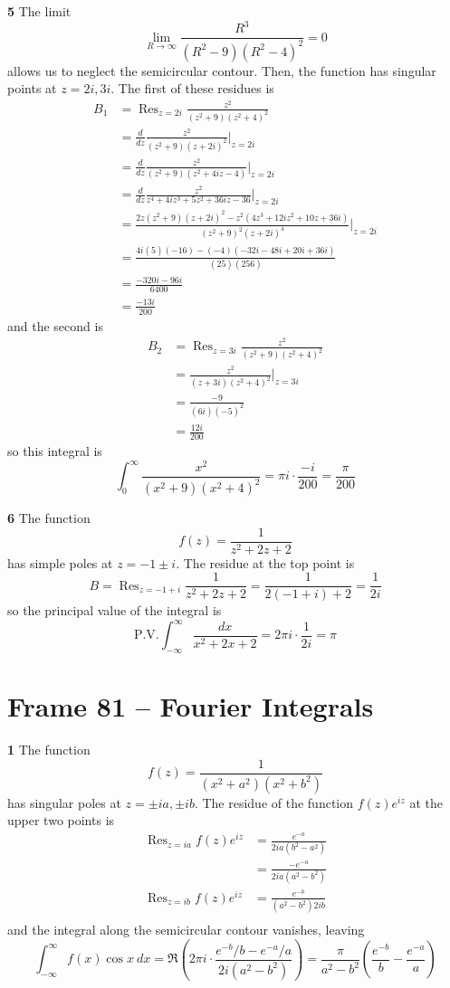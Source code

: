 \documentclass{article}
\DeclareMathOperator{\Res}{Res}
\begin{document}
\textbf{5}
The limit
\[
	\lim_{R \to \infty} \frac{R^3}{(R^2 - 9)(R^2 - 4)^2} = 0
\]
allows us to neglect the semicircular contour. Then, the function has singular points at $z = 2i, 3i$. The first of these residues is
\begin{align*}
	B_1
	&= \Res_{z = 2i} \frac{z^2}{(z^2 + 9)(z^2 + 4)^2} \\
	&= \frac{d}{dz} \frac{z^2}{(z^2 + 9)(z + 2i)^2} \Big|_{z = 2i} \\
	&= \frac{d}{dz} \frac{z^2}{(z^2 + 9)(z^2 + 4iz - 4)}  \Big|_{z = 2i} \\
	&= \frac{d}{dz} \frac{z^2}{z^4 + 4iz^3 + 5z^2 + 36iz - 36} \Big|_{z = 2i} \\
	&= \frac{2z(z^2 + 9)(z + 2i)^2 - z^2(4z^3 + 12iz^2 + 10z + 36i)}
		{(z^2 + 9)^2(z + 2i)^4} \Big|_{z = 2i} \\
	&= \frac{4i(5)(-16) - (-4)(-32i - 48i + 20i + 36i)}{(25)(256)} \\
	&= \frac{-320i - 96i}{6400} \\
	&= \frac{-13i}{200}
\end{align*}
and the second is
\begin{align*}
	B_2
	&= \Res_{z = 3i} \frac{z^2}{(z^2 + 9)(z^2 + 4)^2} \\
	&= \frac{z^2}{(z + 3i)(z^2 + 4)^2} \Big|_{z = 3i} \\
	&= \frac{-9}{(6i)(-5)^2} \\
	&= \frac{12i}{200}
\end{align*}
so this integral is
\[
	\int_0^\infty \frac{x^2}{(x^2 + 9)(x^2 + 4)^2}
	= \pi i \cdot \frac{-i}{200}
	= \frac{\pi}{200}
\]

\textbf{6}
The function
\[
	f(z) = \frac{1}{z^2 + 2z + 2}
\]
has simple poles at $z = -1 \pm i$. The residue at the top point is
\[
	B
	= \Res_{z = -1+i} \frac{1}{z^2 + 2z + 2}
	= \frac{1}{2(-1 + i) + 2} 
	= \frac{1}{2i}
\]
so the principal value of the integral is
\[
	\text{P.V.} \int_{-\infty}^\infty \frac{dx}{x^2 + 2x + 2}
	= 2\pi i \cdot \frac{1}{2i}
	= \pi
\]

\clearpage
\section{Frame 81 -- Fourier Integrals}
\textbf{1}
The function
\[
	f(z) = \frac{1}{(x^2 + a^2)(x^2 + b^2)}
\]
has singular poles at $z = \pm ia, \pm ib$. The residue of the function $f(z) e^{iz}$ at the upper two points is
\begin{align*}
	\Res_{z=ia} f(z) e^{iz}
	&= \frac{e^{-a}}{2ia(b^2 - a^2)} \\
	&= \frac{-e^{-a}}{2ia(a^2 - b^2)} \\
	\Res_{z=ib} f(z) e^{iz}
	&= \frac{e^{-b}}{(a^2 - b^2)2ib} \\
\end{align*}
and the integral along the semicircular contour vanishes, leaving
\[
	\int_{-\infty}^\infty f(x) \cos x~dx 
	= \Re\left(2\pi i \cdot \frac{e^{-b}/b - e^{-a}/a}{2i(a^2 - b^2)}  \right)
	= \frac{\pi}{a^2 - b^2} \left( \frac{e^{-b}}{b} - \frac{e^{-a}}{a} \right)
\]
\end{document}
